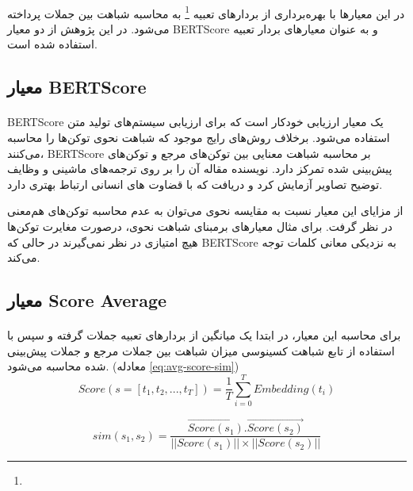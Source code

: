 \paragraph{}{
    در این معیارها با بهره‌برداری از بردارهای تعبیه
    \footnote{}
    به محاسبه شباهت بین جملات پرداخته می‌شود. 
    در این پژوهش از دو معیار
    BERTScore \cite{zhang2019bertscore}
    و 
    به عنوان معیارهای بردار تعبیه استفاده شده است.
}

\subsection{
  معیار BERTScore \cite{zhang2019bertscore}
} \label{subsec:BERTScore}
\paragraph{}{
    BERTScore 
    یک معیار ارزیابی خودکار است که برای ارزیابی 
    سیستم‌های تولید متن استفاده می‌شود.
    برخلاف روش‌های رایج موجود که شباهت 
    نحوی توکن‌ها را محاسبه می‌کنند، 
    BERTScore 
    بر محاسبه شباهت معنایی بین توکن‌های مرجع و
    توکن‌های پیش‌بینی شده تمرکز دارد. 
    نویسنده مقاله آن را بر روی ترجمه‌های ماشینی و 
    وظایف توضیح تصاویر آزمایش کرد و 
    دریافت که با قضاوت های انسانی ارتباط بهتری دارد.

    از مزایای این معیار نسبت به مقایسه نحوی می‌توان به عدم محاسبه 
    توکن‌های هم‌معنی در نظر گرفت. برای مثال معیارهای برمبنای شباهت نحوی، 
    درصورت مغایرت توکن‌ها هیچ امتیازی در نظر نمی‌گیرند در حالی که
    BERTScore
    به نزدیکی معانی کلمات توجه می‌کند.
}

\subsection{
    معیار 
    Score Average
} \label{subsec:average-score}
\paragraph{}{
    برای محاسبه این معیار، در ابتدا یک میانگین از بردارهای تعبیه جملات گرفته 
    و سپس با استفاده از تابع شباهت کسینوسی میزان شباهت بین جملات مرجع و جملات
    پیش‌بینی شده محاسبه می‌شود.
    (معادله \ref{eq:avg-score-sim})
    \begin{equation}
        \label{eq:avg-score}
        Score(s = [t_1, t_2, ..., t_T]) = \frac{1}{T}\sum_{i=0}^{T}{Embedding(t_i)}
    \end{equation}

    \begin{equation}
        \label{eq:avg-score-sim}
        sim(s_1, s_2) = \frac{\vec{Score(s_1)}.\vec{Score(s_2)}}{||Score(s_1)||\times||Score(s_2)||} 
    \end{equation}
}



